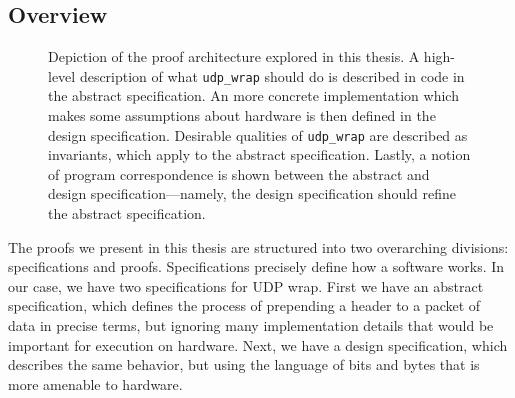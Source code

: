 \documentclass[twoside]{memoir}
\begin{document}
\subsection{Overview}
\begin{figure}[h]
    \centering
    \caption{Depiction of the proof architecture explored in this thesis.
    A high-level description of what \lstinline{udp_wrap} should do
    is described in code in the abstract specification.
    An more concrete implementation which makes some assumptions about hardware
    is then defined in the design specification.
    Desirable qualities of \lstinline{udp_wrap} are described as invariants,
    which apply to the abstract specification.
    Lastly, a notion of program correspondence is shown between the
    abstract and design specification---namely, the design specification
    should refine the abstract specification.
    }
    \label{fig:proof-structure-abstract-design}
\end{figure}
The proofs we present in this thesis are structured into 
two overarching divisions: specifications and proofs.
Specifications precisely define how a software works.
In our case, we have two specifications for UDP wrap.
First we have an abstract specification,
which defines the process of prepending a header to a packet of data
in precise terms, but ignoring many implementation details that would
be important for execution on hardware.
Next, we have a design specification,
which describes the same behavior, but using the language of bits and bytes
that is more amenable to hardware.
\end{document}
